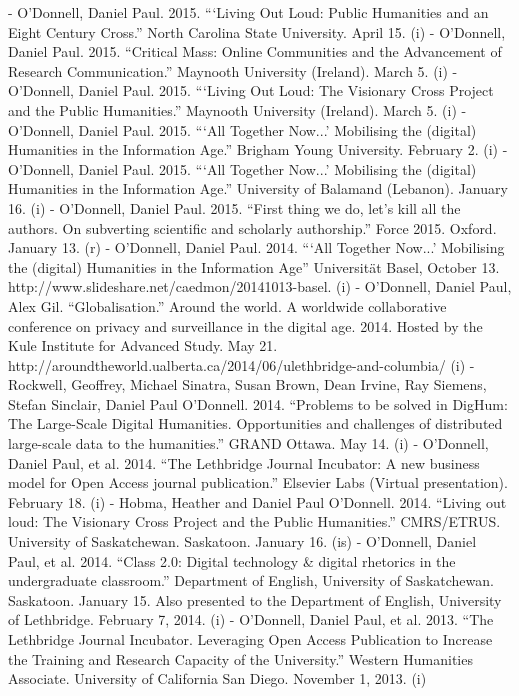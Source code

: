 - O’Donnell, Daniel Paul. 2015. “‘Living Out Loud: Public Humanities and an Eight Century Cross.” North Carolina State University. April 15. (i)
- O’Donnell, Daniel Paul. 2015. “Critical Mass: Online Communities and the Advancement of Research Communication.” Maynooth University (Ireland). March 5. (i)
- O’Donnell, Daniel Paul. 2015. “‘Living Out Loud: The Visionary Cross Project and the Public Humanities.” Maynooth University (Ireland). March 5. (i)
- O’Donnell, Daniel Paul. 2015. “‘All Together Now...’ Mobilising the (digital) Humanities in the Information Age.” Brigham Young University. February 2. (i)
- O’Donnell, Daniel Paul. 2015. “‘All Together Now...’ Mobilising the (digital) Humanities in the Information Age.” University of Balamand (Lebanon). January 16. (i)
- O’Donnell, Daniel Paul. 2015. “First thing we do, let's kill all the authors. On subverting scientific and scholarly authorship.” Force 2015. Oxford. January 13. (r)
- O’Donnell, Daniel Paul. 2014. “‘All Together Now...’ Mobilising the (digital) Humanities in the Information Age” Universität Basel, October 13. http:/\allowbreak{}/\allowbreak{}www.slideshare.net/\allowbreak{}caedmon/\allowbreak{}20141013-basel. (i)
- O'Donnell, Daniel Paul, Alex Gil. “Globalisation.” Around the world. A worldwide collaborative conference on privacy and surveillance in the digital age. 2014. Hosted by the Kule Institute for Advanced Study. May 21. http:/\allowbreak{}/\allowbreak{}aroundtheworld.ualberta.ca/\allowbreak{}2014/\allowbreak{}06/\allowbreak{}ulethbridge-and-columbia/\allowbreak{} (i)
- Rockwell, Geoffrey, Michael Sinatra, Susan Brown, Dean Irvine, Ray Siemens, Stefan Sinclair, Daniel Paul O'Donnell. 2014. “Problems to be solved in DigHum: The Large-Scale Digital Humanities. Opportunities and challenges of distributed large-scale data to the humanities.” GRAND Ottawa. May 14. (i)
- O'Donnell, Daniel Paul, et al. 2014. “The Lethbridge Journal Incubator: A new business model for Open Access journal publication.” Elsevier Labs (Virtual presentation). February 18. (i)
- Hobma\*, Heather and Daniel Paul O'Donnell. 2014. “Living out loud: The Visionary Cross Project and the Public Humanities.” CMRS/\allowbreak{}ETRUS. University of Saskatchewan. Saskatoon. January 16. (is)
- O'Donnell, Daniel Paul, et al. 2014. “Class 2.0: Digital technology & digital rhetorics in the undergraduate classroom.” Department of English, University of Saskatchewan. Saskatoon. January  15. Also presented to the Department of English, University of Lethbridge. February 7, 2014. (i)
- O'Donnell, Daniel Paul, et al. 2013. “The Lethbridge Journal Incubator. Leveraging Open Access Publication to Increase the Training and Research Capacity of the University.” Western Humanities Associate. University of California San Diego. November 1, 2013. (i)
